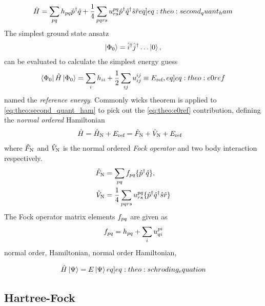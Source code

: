 \begin{align}
    \ham = \sum_{pq} \hshort{p}{q}\crt{p}\ani{q} + \frac{1}{4} \sum_{pqrs} \elmASshort{pq}{rs}\crt{p}\crt{q}\ani{s}\ani{r} \label[eq]{eq:theo:second_quant_ham}
\end{align}
The simplest ground state ansatz
\begin{align*}
    \ket{\Phi_0} = \hat{i}^{\dagger}\hat{j}^{\dagger}\ldots \ket{0},
\end{align*}
can be evaluated to calculate the simplest energy guess
\begin{align}
    \braansatz \ham \ketansatz = \sum_{i} \hshort{i}{i} + \frac{1}{2}\sum_{ij} \elmASshort{ij}{ij} \equiv \Eref, \label[eq]{eq:theo:e0ref}
\end{align}
named the \textit{reference energy}. Commonly wicks theorem is applied to \cref{eq:theo:second_quant_ham} to pick out the \cref{eq:theo:e0ref} contribution, defining the \textit{normal ordered} Hamiltonian
\begin{align*}
    \hat{H} &= \hat{H}_\text{N} + E_{\text{ref}} = \hat{F}_\text{N} + \hat{V}_\text{N} + E_{\text{ref}}
\end{align*}
where $\hat{F}_\text{N}$ and $\hat{V}_\text{N}$ is the normal ordered \textit{Fock operator} and two body interaction respectively.
\begin{align}
    \hat{F}_\text{N} &= \sum_{pq} f_{pq} \{\hat{p}^{\dagger} \hat{q}\}, \\
    \hat{V}_\text{N} &= \frac{1}{4}\sum_{pqrs} u^{pq}_{rs} \{\hat{p}^{\dagger}\hat{q}^{\dagger}\hat{s}\hat{r}\}
\end{align}
The Fock operator matrix elements $f_{pq}$ are given as 
\begin{align*}
    f_{pq} = h_{pq} + \sum_i u^{pi}_{qi}
\end{align*}
normal order, Hamiltonian, normal order Hamiltonian, 

\begin{align}
    \hat{H}\ket{\Psi} = E \ket{\Psi} \label[eq]{eq:theo:schroding_equation}
\end{align}

\subsection{Hartree-Fock}

